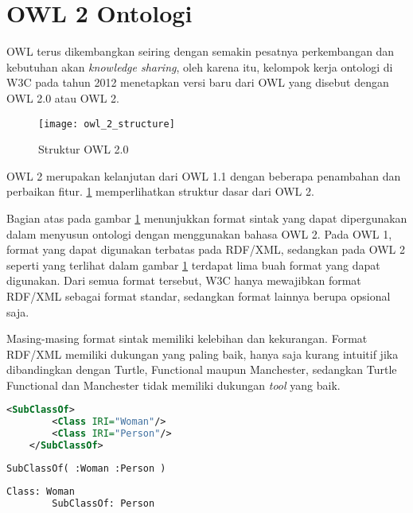 \section{OWL 2 Ontologi}
OWL terus dikembangkan seiring dengan semakin pesatnya perkembangan dan kebutuhan akan \emph{knowledge sharing}, oleh karena itu, kelompok kerja ontologi di W3C pada tahun 2012 menetapkan versi baru dari OWL yang disebut dengan OWL 2.0 atau OWL 2.

\begin{figure}[hb]
	\centering
	\texttt{[image: owl\_2\_structure]}
	\caption{Struktur OWL 2.0}
	\label{fig:owl_2_structure}
\end{figure}

OWL 2 merupakan kelanjutan dari OWL 1.1 dengan beberapa penambahan dan perbaikan fitur. \ref{fig:owl_2_structure} memperlihatkan struktur dasar dari OWL 2.

Bagian atas pada gambar \ref{fig:owl_2_structure} menunjukkan format sintak yang dapat dipergunakan dalam menyusun ontologi dengan menggunakan bahasa OWL 2. Pada OWL 1, format yang dapat digunakan terbatas pada RDF/XML, sedangkan pada OWL 2 seperti yang terlihat dalam gambar \ref{fig:owl_2_structure} terdapat lima buah format yang dapat digunakan. Dari semua format tersebut, W3C hanya mewajibkan format RDF/XML sebagai format standar, sedangkan format lainnya berupa opsional saja.

Masing-masing format sintak memiliki kelebihan dan kekurangan. Format RDF/XML memiliki dukungan yang paling baik, hanya saja kurang intuitif jika dibandingkan dengan Turtle, Functional maupun Manchester, sedangkan Turtle Functional dan Manchester tidak memiliki dukungan \emph{tool} yang baik.

\begin{lstlisting}[language=XML, caption=contoh sintak RDF/XML, xleftmargin=0pt]
	<SubClassOf>
		<Class IRI="Woman"/>
		<Class IRI="Person"/>
	</SubClassOf>
\end{lstlisting}

\begin{lstlisting}[language=XML, caption=contoh sintak functional, xleftmargin=0pt]
	SubClassOf( :Woman :Person )
\end{lstlisting}
	
\begin{lstlisting}[language=XML, caption=contoh manchester syntax, xleftmargin=0pt]
	Class: Woman
		SubClassOf: Person
\end{lstlisting}

